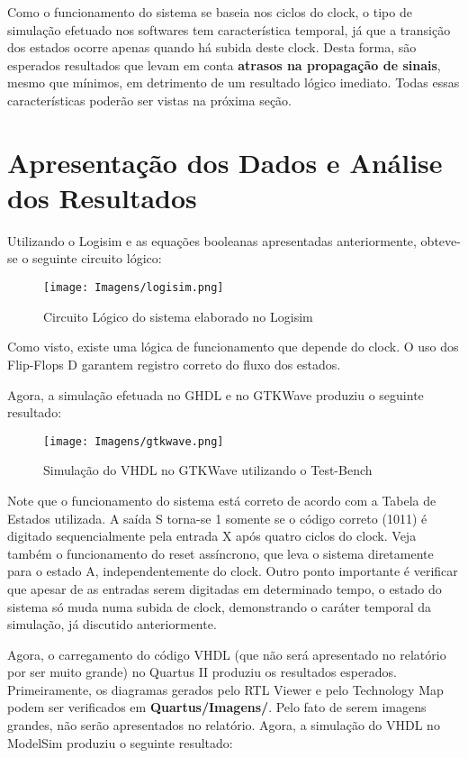 \documentclass[12pt,a4paper]{article}
\begin{document}
Como o funcionamento do sistema se baseia nos ciclos do clock, o tipo de simulação efetuado nos softwares tem característica temporal, já que a transição dos estados ocorre apenas quando há subida deste clock. Desta forma, são esperados resultados que levam em conta \textbf{atrasos na propagação de sinais}, mesmo que mínimos, em detrimento de um resultado lógico imediato. Todas essas características poderão ser vistas na próxima seção.

\section{Apresentação dos Dados e Análise dos Resultados}
Utilizando o Logisim e as equações booleanas apresentadas anteriormente, obteve-se o seguinte circuito lógico:

\begin{figure}[h]
	\centering
	\texttt{[image: Imagens/logisim.png]}
	\caption{Circuito Lógico do sistema elaborado no Logisim}
\end{figure}

Como visto, existe uma lógica de funcionamento que depende do clock. O uso dos Flip-Flops D garantem registro correto do fluxo dos estados.

Agora, a simulação efetuada no GHDL e no GTKWave produziu o seguinte resultado:

\begin{figure}[h]
	\centering
	\texttt{[image: Imagens/gtkwave.png]}
	\caption{Simulação do VHDL no GTKWave utilizando o Test-Bench}
\end{figure}

Note que o funcionamento do sistema está correto de acordo com a Tabela de Estados utilizada. A saída S torna-se 1 somente se o código correto (1011) é digitado sequencialmente pela entrada X após quatro ciclos do clock. Veja também o funcionamento do reset assíncrono, que leva o sistema diretamente para o estado A, independentemente do clock. Outro ponto importante é verificar que apesar de as entradas serem digitadas em determinado tempo, o estado do sistema só muda numa subida de clock, demonstrando o caráter temporal da simulação, já discutido anteriormente.

Agora, o carregamento do código VHDL (que não será apresentado no relatório por ser muito grande) no Quartus II produziu os resultados esperados. Primeiramente, os diagramas gerados pelo RTL Viewer e pelo Technology Map podem ser verificados em \textbf{Quartus/Imagens/}. Pelo fato de serem imagens grandes, não serão apresentados no relatório. Agora, a simulação do VHDL no ModelSim produziu o seguinte resultado:
\end{document}
